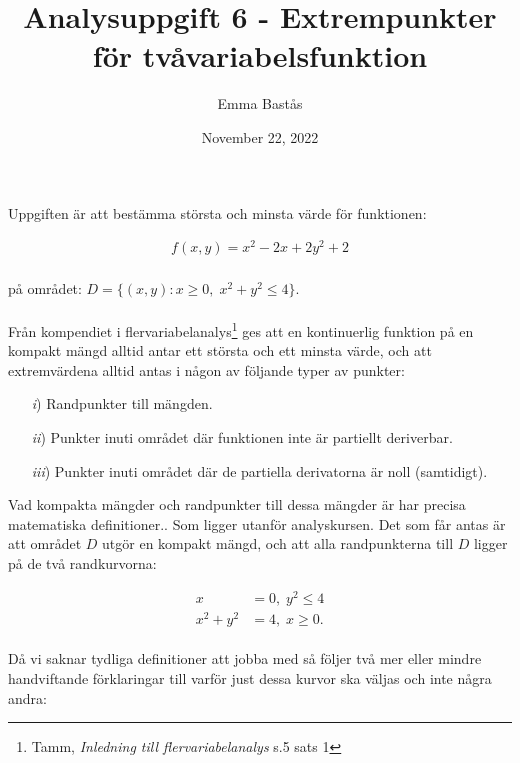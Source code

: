 \documentclass{article}
\title{Analysuppgift 6 - Extrempunkter för tvåvariabelsfunktion}
\author{Emma Bastås}
\date{November 22, 2022}
\begin{document}
\maketitle

\noindent Uppgiften är att bestämma största och minsta värde för funktionen:

\begin{gather*}
  f(x, y) = x^{2} - 2x + 2y^{2} + 2
\end{gather*}
\\
på området: $D = \{ (x, y): x \geq 0,\; x^{2} + y^{2} \leq 4 \}$.
\\
\\
Från kompendiet i flervariabelanalys\footnote{Tamm, \emph{Inledning till flervariabelanalys} s.5 sats 1} ges att en kontinuerlig funktion på en kompakt mängd alltid antar ett största och ett minsta värde, och att extremvärdena alltid antas i någon av följande typer av punkter:

\begin{enumerate}
  \item[\emph{i})] Randpunkter till mängden.
  \item[\emph{ii})] Punkter inuti området där funktionen inte är partiellt deriverbar.
  \item[\emph{iii})] Punkter inuti området där de partiella derivatorna är noll (samtidigt).
\end{enumerate}

\noindent Vad kompakta mängder och randpunkter till dessa mängder är har precisa matematiska definitioner.. Som ligger utanför analyskursen. Det som får antas är att området $D$ utgör en kompakt mängd, och att alla randpunkterna till $D$ ligger på de två randkurvorna:

\begin{align*}
  x &= 0, \; y^{2} \leq 4 \label{*}\tag{$\star$} \\
  x^{2} + y^{2} &= 4, \; x \geq 0\text{.} \label{**}\tag{$\star\star$}
\end{align*}
\\
Då vi saknar tydliga definitioner att jobba med så följer två mer eller mindre handviftande förklaringar till varför just dessa kurvor ska väljas och inte några andra:
\end{document}
